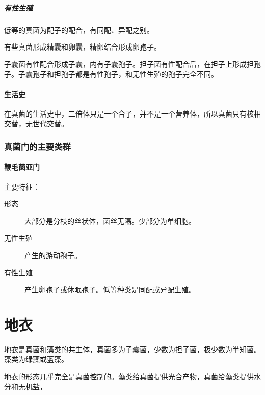 \subparagraph{有性生殖}

低等的真菌为配子的配合，有同配、异配之别。

有些真菌形成精囊和卵囊，精卵结合形成卵孢子。

子囊菌有性配合形成子囊，内有子囊孢子。担子菌有性配合后，在担子上形成担孢子。子囊孢子和担孢子都是有性孢子，和无性生殖的孢子完全不同。

\paragraph{生活史}

在真菌的生活史中，二倍体只是一个合子，并不是一个营养体，所以真菌只有核相交替，无世代交替。

\subsubsection{真菌门的主要类群}

\paragraph{鞭毛菌亚门}

主要特征：  

\begin{description}
	\item[形态] 大部分是分枝的丝状体，菌丝无隔。少部分为单细胞。
	\item[无性生殖] 产生的游动孢子。
	\item[有性生殖] 产生卵孢子或休眠孢子。低等种类是同配或异配生殖。
\end{description}


\section{地衣}

地衣是真菌和藻类的共生体，真菌多为子囊菌，少数为担子菌，极少数为半知菌。藻类为绿藻或蓝藻。

地衣的形态几乎完全是真菌控制的。藻类给真菌提供光合产物，真菌给藻类提供水分和无机盐，